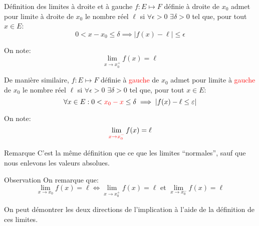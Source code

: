 \documentclass[a4paper]{article}
\begin{document}
\begin{parag}{Définition des limites à droite et à gauche}
    $f: E \mapsto F$ définie à droite de $x_0$ admet pour limite à droite de $x_0$ le nombre réel $\ell$ si $\forall \epsilon > 0$ $\exists \delta > 0$ tel que, pour tout $x \in E$:
    \[0 < x - x_0 \leq \delta \implies \left|f\left(x\right) - \ell\right| \leq \epsilon\]

    On note: 
    \[\lim_{x \to x_0^+} f\left(x\right) = \ell\]
    
    De manière similaire, $f: E \mapsto F$ définie à \textcolor{red}{gauche} de $x_0$ admet pour limite à \textcolor{red}{gauche} de $x_0$ le nombre réel $\ell$ si $\forall \epsilon > 0$ $\exists \delta > 0$ tel que, pour tout $x \in E$:
    \[\forall x \in E: 0 < {\color{red}x_0 - x} \leq \delta \implies \left|f\left(x\right) - \ell \leq \epsilon\right|\]
    
    On note: 
    \[\lim_{{\color{red}x \to x_0^-}} f\left(x\right) = \ell\]


    \begin{subparag}{Remarque}
        C'est la même définition que ce que les limites ``normales'', sauf que nous enlevons les valeurs absolues.
    \end{subparag}

    \begin{subparag}{Observation}
        On remarque que: 
        \[\lim_{x \to x_0} f\left(x\right) = \ell \iff \lim_{x \to x_0^+} f\left(x\right) = \ell \text{ et } \lim_{x \to x_0^-} f\left(x\right) = \ell\]

        On peut démontrer les deux directions de l'implication à l'aide de la définition de ces limites.
    \end{subparag}
\end{parag}
\end{document}
